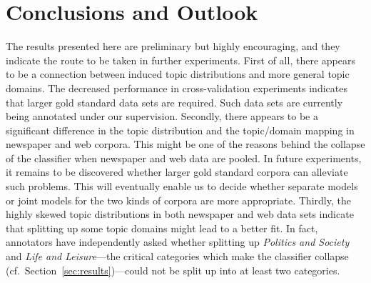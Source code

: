 \documentclass[11pt]{article}
\begin{document}
\section{Conclusions and Outlook}
\label{sec:conclusions}

The results presented here are preliminary but highly encouraging, and they indicate the route to be taken in further experiments.
First of all, there appears to be a connection between induced topic distributions and more general topic domains.
The decreased performance in cross-validation experiments indicates that larger gold standard data sets are required.
Such data sets are currently being annotated under our supervision.
Secondly, there appears to be a significant difference in the topic distribution and the topic\slash domain mapping in newspaper and web corpora.
This might be one of the reasons behind the collapse of the classifier when newspaper and web data are pooled.
In future experiments, it remains to be discovered whether larger gold standard corpora can alleviate such problems.
This will eventually enable us to decide whether separate models or joint models for the two kinds of corpora are more appropriate.
Thirdly, the highly skewed topic distributions in both newspaper and web data sets indicate that splitting up some topic domains might lead to a better fit.
In fact, annotators have independently asked whether splitting up \textit{Politics and Society} and \textit{Life and Leisure}---the critical categories which make the classifier collapse (cf.\ Section~\ref{sec:results})---could not be split up into at least two categories.



\end{document}
